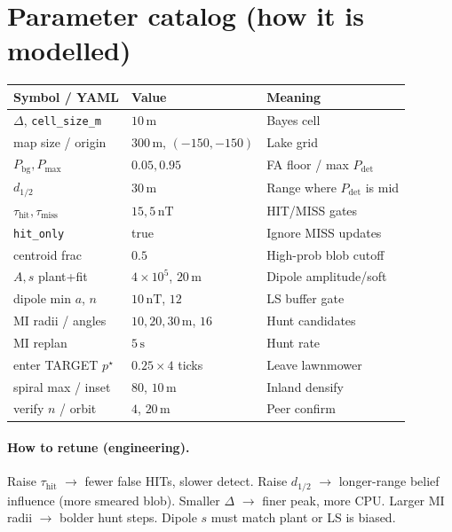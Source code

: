 \documentclass[11pt,a4paper]{article}
\begin{document}
\section{Parameter catalog (how it is modelled)}

\begin{center}
\small
\begin{tabular}{@{}llp{7.2cm}@{}}
\toprule
\textbf{Symbol / YAML} & \textbf{Value} & \textbf{Meaning} \\
\midrule
\(\Delta\), \texttt{cell\_size\_m} & \(10\,\mathrm{m}\) & Bayes cell \\
map size / origin & \(300\,\mathrm{m}\), \((-150,-150)\) & Lake grid \\
\(P_{\mathrm{bg}},P_{\max}\) & \(0.05,0.95\) & FA floor / max \(P_{\mathrm{det}}\) \\
\(d_{1/2}\) & \(30\,\mathrm{m}\) & Range where \(P_{\mathrm{det}}\) is mid \\
\(\tau_{\mathrm{hit}},\tau_{\mathrm{miss}}\) & \(15,5\,\mathrm{nT}\) & HIT/MISS gates \\
\texttt{hit\_only} & true & Ignore MISS updates \\
centroid frac & \(0.5\) & High-prob blob cutoff \\
\(A,s\) plant+fit & \(4\times10^{5}\), \(20\,\mathrm{m}\) & Dipole amplitude/soft \\
dipole min \(a\), \(n\) & \(10\,\mathrm{nT}\), \(12\) & LS buffer gate \\
MI radii / angles & \(10,20,30\,\mathrm{m}\), \(16\) & Hunt candidates \\
MI replan & \(5\,\mathrm{s}\) & Hunt rate \\
enter TARGET \(p^{\star}\) & \(0.25\times4\) ticks & Leave lawnmower \\
spiral max / inset & \(80\), \(10\,\mathrm{m}\) & Inland densify \\
verify \(n\) / orbit & \(4\), \(20\,\mathrm{m}\) & Peer confirm \\
\bottomrule
\end{tabular}
\end{center}

\paragraph{How to retune (engineering).}
Raise \(\tau_{\mathrm{hit}}\) \(\to\) fewer false HITs, slower detect.
Raise \(d_{1/2}\) \(\to\) longer-range belief influence (more smeared blob).
Smaller \(\Delta\) \(\to\) finer peak, more CPU. Larger MI radii \(\to\) bolder
hunt steps. Dipole \(s\) must match plant or LS is biased.
\end{document}
